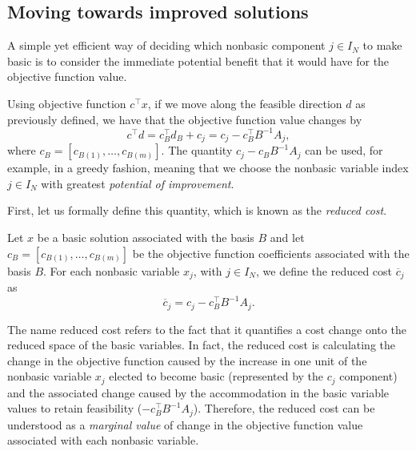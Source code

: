 \subsection{Moving towards improved solutions}

A simple yet efficient way of deciding which nonbasic component $j \in I_N$ to make basic is to consider the immediate potential benefit that it would have for the objective function value. 

Using objective function $c^\top x$, if we move along the feasible direction $d$ as previously defined, we have that the objective function value changes by 
%
\begin{equation*}
	c^\top d = c_B^\top d_B + c_j = c_j - c_B^\top B^{-1}A_j,
\end{equation*}
%
where $c_B = [c_{B(1)}, \dots, c_{B(m)}]$. The quantity $c_j - c_BB^{-1}A_j$ can be used, for example, in a greedy fashion, meaning that we choose the nonbasic variable index $j \in I_N$ with greatest \emph{potential of improvement}.

First, let us formally define this quantity, which is known as the \emph{reduced cost}. 

\begin{definition}
	Let $x$ be a basic solution associated with the basis $B$ and let $c_B = [c_{B(1)}, \dots, c_{B(m)}]$ be the objective function coefficients associated with the basis $B$. For each nonbasic variable $x_j$, with $j \in I_N$, we define the reduced cost $\overline{c}_j$ as
	\begin{equation*}
		\overline{c}_j = c_j - c_B^\top B^{-1}A_j.
	\end{equation*}
\end{definition}

The name reduced cost refers to the fact that it quantifies a cost change onto the reduced space of the basic variables. In fact, the reduced cost is calculating the change in the objective function caused by the increase in one unit of the nonbasic variable $x_j$ elected to become basic (represented by the $c_j$ component) and the associated change caused by the accommodation in the basic variable values to retain feasibility ($-c_B^\top B^{-1}A_j$). Therefore, the reduced cost can be understood as a \emph{marginal value} of change in the objective function value associated with each nonbasic variable.

